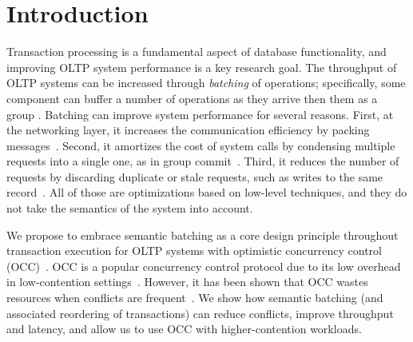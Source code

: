 \section{Introduction}\label{sec:intro}

Transaction processing is a fundamental aspect of database functionality, and improving OLTP system performance is a key research goal. The throughput of OLTP systems can be increased through \emph{batching} of operations; specifically, some component can buffer a number of operations as they arrive then  them as a group \cite{friedman1997packing,debrabant2013anti,hagmann1987reimplementing}.
Batching can improve system performance for several reasons. First, at the networking layer, it increases the communication efficiency by packing messages~\cite{ding2015centiman,friedman1997packing}. Second, it amortizes the cost of system calls by condensing multiple requests into a single one, as in group commit~\cite{debrabant2013anti,hagmann1987reimplementing}. Third, it reduces the number of requests by discarding duplicate or stale requests, such as writes to the same record~\cite{faleiro2014lazy}. All of those are optimizations based on low-level techniques, and they do not take the semantics of the system into account.

We propose to embrace semantic batching as a core design principle throughout transaction execution for OLTP systems with optimistic concurrency control (OCC)~\cite{kung81tods}.
OCC is a popular concurrency control protocol due to its low overhead in low-contention
settings~\cite{adya97podc, baker11cidr, bernstein2015optimizing,bernstein11cidr,
	bernstein11vldb, corbett12osdi,warp, patterson12vldb,peng10osdi,larson2011high}. However, it has been shown that OCC
wastes resources when conflicts are frequent~\cite{agrawal1987concurrency}. We
show how semantic batching (and associated reordering of transactions) can reduce conflicts, improve
throughput and latency, and allow us to use OCC with higher-contention workloads.


